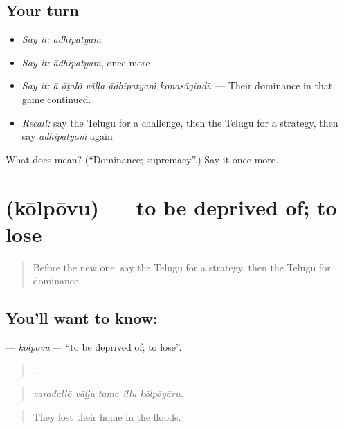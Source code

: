 \subsection*{Your turn}
\begin{itemize}
\raggedright
  \item \emph{Say it:} \emph{ādhipatyaṁ}
  \item \emph{Say it:} \emph{ādhipatyaṁ}, once more
  \item \emph{Say it:} \emph{ā āṭalō vāḷḷa ādhipatyaṁ konasāgindi.} — Their dominance in that game continued.
  \item \emph{Recall:} say the Telugu for a challenge, then the Telugu for a strategy, then say \emph{ādhipatyaṁ} again
\end{itemize}

\begin{tcolorbox}[breakable,colback=teal!4,colframe=teal!35!black,title={Before you move on}]
What does  mean? (\textquotedblleft{}Dominance; supremacy\textquotedblright{}.) Say it once more.
\end{tcolorbox}
\section[\texorpdfstring{\te{కోల్పోవు} (kōlpōvu)}{కోల్పోవు (kōlpōvu)}]{ (kōlpōvu) — to be deprived of; to lose}

\label{lesson:TE-C433-kolpovu}



\begin{quote}
Before the new one: say the Telugu for a strategy, then the Telugu for dominance.
\end{quote}

\subsection*{You'll want to know: }
\textbf{} — \emph{kōlpōvu} — \textquotedblleft{}to be deprived of; to lose\textquotedblright{}.

\begin{quote}
    .
\end{quote}

\begin{quote}
\emph{varadallō vāḷḷu tama illu kōlpōyāru.}
\end{quote}

\begin{quote}
They lost their home in the floods.
\end{quote}

